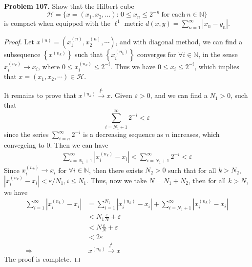 \documentclass[12pt,leqno]{amsart}
\theoremstyle{definition}
\numberwithin{equation}{subsection}
\begin{document}
\medskip

\noindent
{\bf Problem 107.}
Show that the Hilbert cube
$$
\mathcal{H}=\{x=(x_1,x_2,\ldots):\, 0\leq x_n\leq 2^{-n}\ \text{for each}\ n\in\mathbb{N}\}
$$
is compact when equipped with the $\ell^1$ metric
$\displaystyle d(x,y)=\sum_{n=1}^\infty|x_n-y_n|$.
\begin{proof}
Let $x^{(n)} = \left(x^{(n)}_1, x^{(n)}_2, \cdots\right)$, and with diagonal method, we can find a subsequence $\left\{x^{(n_k)}\right\}$ such that $\left\{x^{(n_k)}_i\right\}$ converges for $\forall i\in\mathbb{N}$, in the sense $x_i^{(n_k)}\to x_i$, where $0\leq x_i^{(n_k)}\leq 2^{-i}$. Thus we have $0\leq x_i \leq 2^{-i}$, which implies that $x = \left(x_1, x_2,\cdots\right)\in \mathcal{H}$. 

It remains to prove that $x^{(n_k)}\stackrel{l^1}{\longrightarrow}x$. Given $\varepsilon > 0$, and we can find a $N_1 > 0$, such that 
$$\sum^\infty_{i = N_1 +1}2^{-i} < \varepsilon$$
since the series $\sum^\infty_{i=n}2^{-i}$ is a decreasing sequence as $n$ increases, which convegeing to $0$. Then we can have
\begin{align*}
    \sum^\infty_{i = N_1 + 1} \left|x_i^{(n_k)} - x_i\right| < \sum^\infty_{i = N_1 +1}2^{-i} < \varepsilon
\end{align*}
Since $x_i^{(n_k)}\to x_i$ for $\forall i\in\mathbb{N}$, then there exists $N_2 > 0$ such that for all $k > N_2$, $\left|x_i^{(n_k)} - x_i\right| < \varepsilon/N_1, i\leq N_1$. Thus, now we take $N = N_1 + N_2$, then for all $k > N$, we have 
\begin{align*}
    \sum^\infty_{i = 1}\left|x_i^{(n_k)} - x_i\right| & =  \sum^{N_1}_{i = 1}\left|x_i^{(n_k)} - x_i\right| + \sum^\infty_{i = N_1 + 1} \left|x_i^{(n_k)} - x_i\right| \\
    & < N_1 \frac{\varepsilon}{N} + \varepsilon \\
    & < N \frac{\varepsilon}{N} + \varepsilon \\
    & < 2 \varepsilon \\
    \Rightarrow &\, x^{(n_k)}\stackrel{l^1}{\longrightarrow}x
\end{align*}
The proof is complete.
\end{proof}

\medskip
\end{document}
